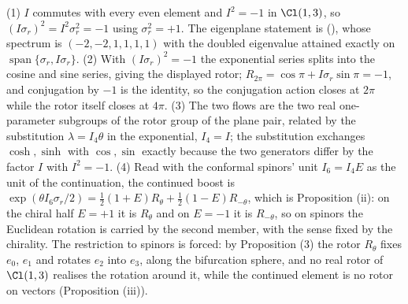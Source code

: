 (1) $I$ commutes with every even element and $I^{2} = -1$ in $\Cl(1,3)$, so $(I\sigma_r)^{2} = I^{2}\sigma_r^{2} = -1$ using $\sigma_r^{2} = +1$. The eigenplane statement is \cite[Thm.~6.1]{ButlerT5} (), whose spectrum is $(-2,-2,1,1,1,1)$ with the doubled eigenvalue attained exactly on $\operatorname{span}\{\sigma_r, I\sigma_r\}$. (2) With $(I\sigma_r)^{2} = -1$ the exponential series splits into the cosine and sine series, giving the displayed rotor; $R_{2\pi} = \cos\pi + I\sigma_r\sin\pi = -1$, and conjugation by $-1$ is the identity, so the conjugation action closes at $2\pi$ while the rotor itself closes at $4\pi$. (3) The two flows are the two real one-parameter subgroups of the rotor group of the plane pair, related by the substitution $\lambda = I_{4}\theta$ in the exponential, $I_{4} = I$; the substitution exchanges $\cosh, \sinh$ with $\cos, \sin$ exactly because the two generators differ by the factor $I$ with $I^{2} = -1$. (4) Read with the conformal spinors' unit $I_{6} = I_{4}E$ as the unit of the continuation, the continued boost is $\exp(\theta I_{6}\sigma_r/2) = \tfrac12(1+E)R_\theta + \tfrac12(1-E)R_{-\theta}$, which is Proposition (ii): on the chiral half $E = +1$ it is $R_\theta$ and on $E = -1$ it is $R_{-\theta}$, so on spinors the Euclidean rotation is carried by the second member, with the sense fixed by the chirality. The restriction to spinors is forced: by Proposition (3) the rotor $R_\theta$ fixes $e_0$, $e_1$ and rotates $e_2$ into $e_3$, along the bifurcation sphere, and no real rotor of $\Cl(1,3)$ realises the rotation around it, while the continued element is no rotor on vectors (Proposition (iii)).
